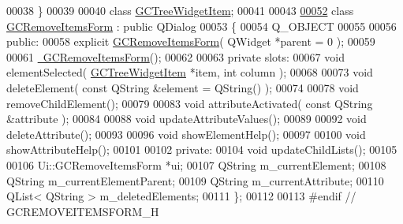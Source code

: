 \begin{DoxyCode}
00038 \}
00039 
00040 \textcolor{keyword}{class }\hyperlink{class_g_c_tree_widget_item}{GCTreeWidgetItem};
00041 
00043 
\hypertarget{gcremoveitemsform_8h_source_l00052}{}\hyperlink{class_g_c_remove_items_form}{00052} \textcolor{keyword}{class }\hyperlink{class_g_c_remove_items_form}{GCRemoveItemsForm} : \textcolor{keyword}{public} QDialog
00053 \{
00054   Q\_OBJECT
00055   
00056 \textcolor{keyword}{public}:
00058   \textcolor{keyword}{explicit} \hyperlink{class_g_c_remove_items_form_a8ef59eb50c10a50f70ef268110916d39}{GCRemoveItemsForm}( QWidget *parent = 0 );
00059 
00061   \hyperlink{class_g_c_remove_items_form_a9cf2b70d83b8f13e0283a76ef62b47d2}{~GCRemoveItemsForm}();
00062 
00063 \textcolor{keyword}{private} slots:
00067   \textcolor{keywordtype}{void} elementSelected( \hyperlink{class_g_c_tree_widget_item}{GCTreeWidgetItem} *item, \textcolor{keywordtype}{int} column );
00068 
00073   \textcolor{keywordtype}{void} deleteElement( \textcolor{keyword}{const} QString &element = QString() );
00074 
00078   \textcolor{keywordtype}{void} removeChildElement();
00079 
00083   \textcolor{keywordtype}{void} attributeActivated( \textcolor{keyword}{const} QString &attribute );
00084 
00088   \textcolor{keywordtype}{void} updateAttributeValues();
00089 
00092   \textcolor{keywordtype}{void} deleteAttribute();
00093 
00096   \textcolor{keywordtype}{void} showElementHelp();
00097 
00100   \textcolor{keywordtype}{void} showAttributeHelp();
00101   
00102 \textcolor{keyword}{private}:
00104   \textcolor{keywordtype}{void} updateChildLists();
00105 
00106   Ui::GCRemoveItemsForm *ui;
00107   QString m\_currentElement;
00108   QString m\_currentElementParent;
00109   QString m\_currentAttribute;
00110   QList< QString > m\_deletedElements;
00111 \};
00112 
00113 \textcolor{preprocessor}{#endif // GCREMOVEITEMSFORM\_H}
\end{DoxyCode}
